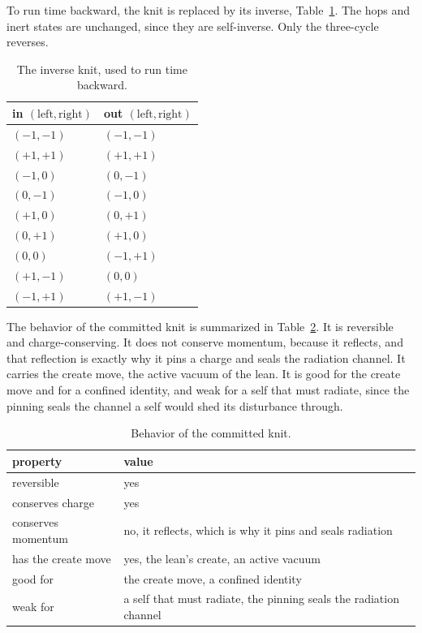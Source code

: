 To run time backward, the knit is replaced by its inverse, Table~\ref{tab:inverse}. The hops and inert states are unchanged, since they are self-inverse. Only the three-cycle reverses.

\begin{table}[ht]
\centering
\begin{tabular}{@{}ll@{}}
\toprule
in $(\text{left}, \text{right})$ & out $(\text{left}, \text{right})$ \\
\midrule
$(-1,-1)$ & $(-1,-1)$ \\
$(+1,+1)$ & $(+1,+1)$ \\
$(-1,0)$ & $(0,-1)$ \\
$(0,-1)$ & $(-1,0)$ \\
$(+1,0)$ & $(0,+1)$ \\
$(0,+1)$ & $(+1,0)$ \\
$(0,0)$ & $(-1,+1)$ \\
$(+1,-1)$ & $(0,0)$ \\
$(-1,+1)$ & $(+1,-1)$ \\
\bottomrule
\end{tabular}
\caption{The inverse knit, used to run time backward.}
\label{tab:inverse}
\end{table}

The behavior of the committed knit is summarized in Table~\ref{tab:behavior}. It is reversible and charge-conserving. It does not conserve momentum, because it reflects, and that reflection is exactly why it pins a charge and seals the radiation channel. It carries the create move, the active vacuum of the lean. It is good for the create move and for a confined identity, and weak for a self that must radiate, since the pinning seals the channel a self would shed its disturbance through.

\begin{table}[ht]
\centering
\begin{tabular}{@{}ll@{}}
\toprule
property & value \\
\midrule
reversible & yes \\
conserves charge & yes \\
conserves momentum & no, it reflects, which is why it pins and seals radiation \\
has the create move & yes, the lean's create, an active vacuum \\
good for & the create move, a confined identity \\
weak for & a self that must radiate, the pinning seals the radiation channel \\
\bottomrule
\end{tabular}
\caption{Behavior of the committed knit.}
\label{tab:behavior}
\end{table}

